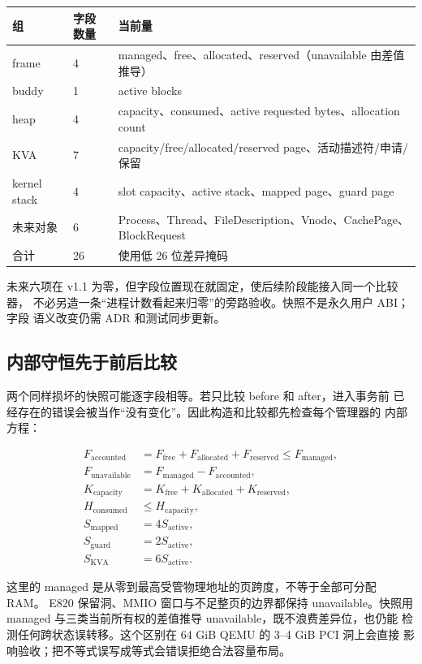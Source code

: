 \small
\noindent\begin{tabularx}{\textwidth}{L{0.14\textwidth}L{0.12\textwidth}X}
\toprule
组 & 字段数量 & 当前量\\
\midrule
frame & 4 & managed、free、allocated、reserved（unavailable 由差值推导）\\
buddy & 1 & active blocks\\
heap & 4 & capacity、consumed、active requested bytes、allocation count\\
KVA & 7 & capacity/free/allocated/reserved page、活动描述符/申请/保留\\
kernel stack & 4 & slot capacity、active stack、mapped page、guard page\\
未来对象 & 6 & Process、Thread、FileDescription、Vnode、CachePage、BlockRequest\\
\midrule
合计 & 26 & 使用低 26 位差异掩码\\
\bottomrule
\end{tabularx}
\normalsize

未来六项在 v1.1 为零，但字段位置现在就固定，使后续阶段能接入同一个比较器，
不必另造一条“进程计数看起来归零”的旁路验收。快照不是永久用户 ABI；字段
语义改变仍需 ADR 和测试同步更新。

\subsection{内部守恒先于前后比较}

两个同样损坏的快照可能逐字段相等。若只比较 before 和 after，进入事务前
已经存在的错误会被当作“没有变化”。因此构造和比较都先检查每个管理器的
内部方程：

\[
\begin{aligned}
F_{\mathrm{accounted}}
  &=F_{\mathrm{free}}+F_{\mathrm{allocated}}
    +F_{\mathrm{reserved}}
    \le F_{\mathrm{managed}},\\
F_{\mathrm{unavailable}}
  &=F_{\mathrm{managed}}-F_{\mathrm{accounted}},\\
K_{\mathrm{capacity}}
  &=K_{\mathrm{free}}+K_{\mathrm{allocated}}+K_{\mathrm{reserved}},\\
H_{\mathrm{consumed}} &\le H_{\mathrm{capacity}},\\
S_{\mathrm{mapped}} &=4S_{\mathrm{active}},\\
S_{\mathrm{guard}} &=2S_{\mathrm{active}},\\
S_{\mathrm{KVA}} &=6S_{\mathrm{active}}.
\end{aligned}
\]

这里的 managed 是从零到最高受管物理地址的页跨度，不等于全部可分配 RAM。
E820 保留洞、MMIO 窗口与不足整页的边界都保持 unavailable。快照用
managed 与三类当前所有权的差值推导 unavailable，既不浪费差异位，也仍能
检测任何跨状态误转移。这个区别在 64 GiB QEMU 的 3--4 GiB PCI 洞上会直接
影响验收；把不等式误写成等式会错误拒绝合法容量布局。

